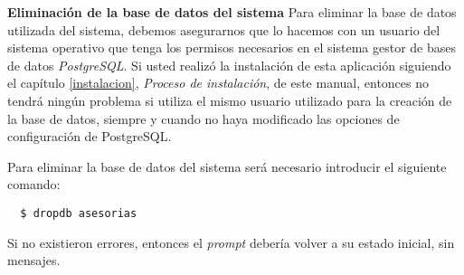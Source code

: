 \item \textbf{Eliminación de la base de datos del sistema}
  Para eliminar la base de datos utilizada del sistema, debemos asegurarnos que
  lo hacemos con un usuario del sistema operativo que tenga los permisos
  necesarios en el sistema gestor de bases de datos \textit{PostgreSQL}. Si
  usted realizó la instalación de esta aplicación siguiendo el capítulo
  \ref{instalacion}, \textit{Proceso de instalación}, de este manual, entonces
  no tendrá ningún problema si utiliza el mismo usuario utilizado para la
  creación de la base de datos, siempre y cuando no haya modificado las opciones
  de configuración de PostgreSQL.

  Para eliminar la base de datos del sistema será necesario introducir el
  siguiente comando:

  \begin{verbatim}
  $ dropdb asesorias
  \end{verbatim}

  Si no existieron errores, entonces el \textit{prompt} debería volver a su
  estado inicial, sin mensajes.